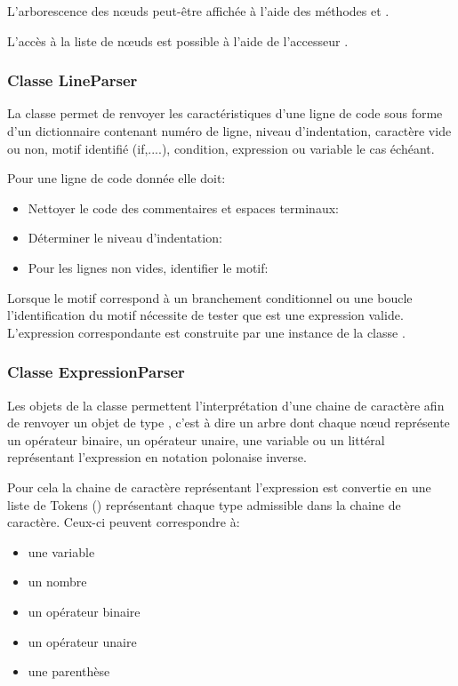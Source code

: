 L'arborescence des n\oe uds  peut-être affichée à l'aide des méthodes  et .

L'accès à la liste de n\oe uds  est possible à l'aide de l'accesseur .

\subsubsection{Classe LineParser}

La classe  permet de renvoyer les caractéristiques d'une ligne de code sous forme d'un dictionnaire contenant numéro de ligne, niveau d'indentation, caractère vide ou non, motif identifié (if,....), condition, expression ou variable le cas échéant.

Pour une ligne de code donnée elle doit:
\begin{itemize}
	\item Nettoyer le code des commentaires et espaces terminaux: 
	\item Déterminer le niveau d'indentation: 
	\item Pour les lignes non vides, identifier le motif: 
\end{itemize}

Lorsque le motif correspond à un branchement conditionnel  ou une boucle  l'identification du motif  nécessite de tester que  est une expression valide. L'expression correspondante est construite par une instance de la classe .


\subsubsection{Classe ExpressionParser}

Les objets de la classe   permettent l'interprétation d'une chaine de caractère afin de renvoyer un objet de type , c'est à dire un arbre dont chaque n\oe ud représente un opérateur binaire, un opérateur unaire, une variable ou un littéral représentant l'expression en notation polonaise inverse.

Pour cela la chaine de caractère représentant l'expression est convertie en une liste de Tokens () représentant chaque type admissible dans la chaine de caractère. Ceux-ci peuvent correspondre à:
\begin{itemize}
	\item une variable 
	\item un nombre 
	\item un opérateur binaire 
	\item un opérateur unaire 
	\item une parenthèse 
\end{itemize}

